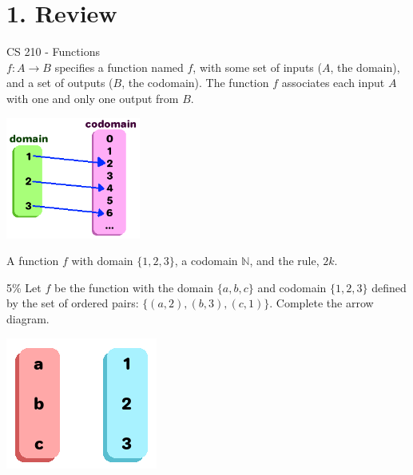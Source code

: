 \documentclass[a4paper,12pt]{book}
\title{}
\author{Rachel Morris}
\date{\today}
\begin{document}
    \togglefalse{answerkey}
    

    \section*{1. Review}

        \begin{intro}{CS 210 - Functions} ~\\
            $f : A \to B$ specifies a function named $f$,
            with some set of inputs ($A$, the domain), and a set of
            outputs ($B$, the codomain). The function $f$ associates
            each input $A$ with one and only one output from $B$.

            \begin{center}
                \includegraphics[height=4cm]{images/5-3-function.png}
            \end{center}
                
            A function $f$ with domain $\{1, 2, 3\}$,
            a codomain $\mathbb{N}$, and the rule, $2k$.
        \end{intro}

        \begin{question}{1}{5\%}
            Let $f$ be the function with the domain $\{a, b, c\}$ and codomain
            $\{1, 2, 3\}$ defined by the set of ordered pairs:
            $\{(a, 2), (b, 3), (c, 1)\}$. Complete the arrow diagram.

            \begin{center}
                \includegraphics{images/5-3-question-function.png}
            \end{center}
        \end{question}
\end{document}
